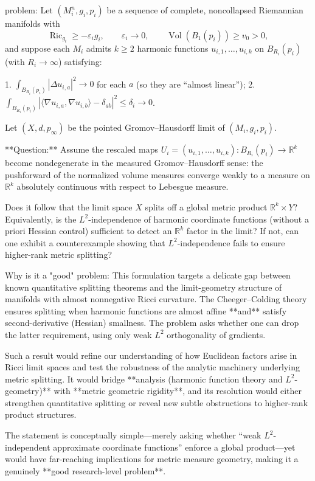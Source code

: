 problem:  
Let \((M_i^n,g_i,p_i)\) be a sequence of complete, noncollapsed Riemannian manifolds with  
\[
\operatorname{Ric}_{g_i}\ge -\varepsilon_i g_i,\qquad \varepsilon_i\to 0,\qquad \operatorname{Vol}(B_1(p_i))\ge v_0>0,
\]  
and suppose each \(M_i\) admits \(k\ge2\) harmonic functions \(u_{i,1},\dots,u_{i,k}\) on \(B_{R_i}(p_i)\) (with \(R_i\to\infty\)) satisfying:  

1. \(\int_{B_{R_i}(p_i)} |\Delta u_{i,a}|^2\to0\) for each \(a\) (so they are “almost linear”);  
2. \(\displaystyle\int_{B_{R_i}(p_i)} |\langle\nabla u_{i,a},\nabla u_{i,b}\rangle-\delta_{ab}|^2\le \delta_i\to0\).  

Let \((X,d,p_\infty)\) be the pointed Gromov–Hausdorff limit of \((M_i,g_i,p_i)\).  

**Question:**  
Assume the rescaled maps \(U_i=(u_{i,1},\dots,u_{i,k}):B_{R_i}(p_i)\to\mathbb{R}^k\) become nondegenerate in the measured Gromov–Hausdorff sense: the pushforward of the normalized volume measures converge weakly to a measure on \(\mathbb{R}^k\) absolutely continuous with respect to Lebesgue measure.  

Does it follow that the limit space \(X\) splits off a global metric product \(\mathbb{R}^k\times Y\)?  
Equivalently, is the \(L^2\)-independence of harmonic coordinate functions (without a priori Hessian control) sufficient to detect an \(\mathbb{R}^k\) factor in the limit?  
If not, can one exhibit a counterexample showing that \(L^2\)-independence fails to ensure higher-rank metric splitting?

Why is it a "good" problem:  
This formulation targets a delicate gap between known quantitative splitting theorems and the limit-geometry structure of manifolds with almost nonnegative Ricci curvature. The Cheeger–Colding theory ensures splitting when harmonic functions are almost affine **and** satisfy second-derivative (Hessian) smallness. The problem asks whether one can drop the latter requirement, using only weak \(L^2\) orthogonality of gradients.  

Such a result would refine our understanding of how Euclidean factors arise in Ricci limit spaces and test the robustness of the analytic machinery underlying metric splitting. It would bridge **analysis (harmonic function theory and \(L^2\)-geometry)** with **metric geometric rigidity**, and its resolution would either strengthen quantitative splitting or reveal new subtle obstructions to higher-rank product structures.  

The statement is conceptually simple—merely asking whether “weak \(L^2\)-independent approximate coordinate functions” enforce a global product—yet would have far-reaching implications for metric measure geometry, making it a genuinely **good research-level problem**.